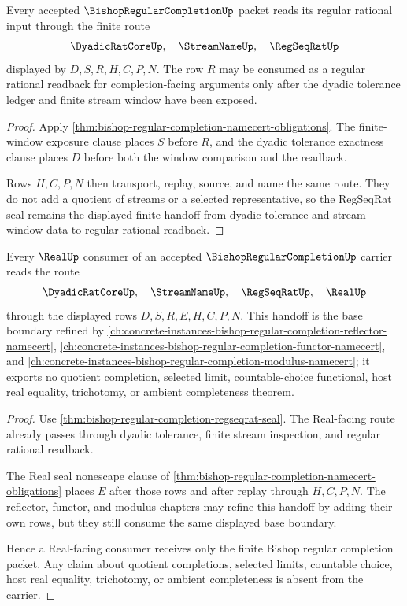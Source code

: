 \begin{theorem}
\label{thm:bishop-regular-completion-regseqrat-seal}
Every accepted $\BishopRegularCompletionUp$ packet reads its regular rational input through the finite route
$$
\DyadicRatCoreUp,\quad \StreamNameUp,\quad \RegSeqRatUp
$$
displayed by $D,S,R,H,C,P,N$. The row $R$ may be consumed as a regular rational readback for completion-facing arguments only after the dyadic tolerance ledger and finite stream window have been exposed.
\end{theorem}
\begin{proof}
Apply \autoref{thm:bishop-regular-completion-namecert-obligations}. The finite-window exposure clause places $S$ before $R$, and the dyadic tolerance exactness clause places $D$ before both the window comparison and the readback.

Rows $H,C,P,N$ then transport, replay, source, and name the same route. They do not add a quotient of streams or a selected representative, so the RegSeqRat seal remains the displayed finite handoff from dyadic tolerance and stream-window data to regular rational readback.
\end{proof}

\begin{theorem}
\label{thm:bishop-regular-completion-real-handoff}
Every $\RealUp$ consumer of an accepted $\BishopRegularCompletionUp$ carrier reads the route
$$
\DyadicRatCoreUp,\quad \StreamNameUp,\quad \RegSeqRatUp,\quad \RealUp
$$
through the displayed rows $D,S,R,E,H,C,P,N$. This handoff is the base boundary refined by \autoref{ch:concrete-instances-bishop-regular-completion-reflector-namecert}, \autoref{ch:concrete-instances-bishop-regular-completion-functor-namecert}, and \autoref{ch:concrete-instances-bishop-regular-completion-modulus-namecert}; it exports no quotient completion, selected limit, countable-choice functional, host real equality, trichotomy, or ambient completeness theorem.
\end{theorem}
\begin{proof}
Use \autoref{thm:bishop-regular-completion-regseqrat-seal}. The Real-facing route already passes through dyadic tolerance, finite stream inspection, and regular rational readback.

The Real seal nonescape clause of \autoref{thm:bishop-regular-completion-namecert-obligations} places $E$ after those rows and after replay through $H,C,P,N$. The reflector, functor, and modulus chapters may refine this handoff by adding their own rows, but they still consume the same displayed base boundary.

Hence a Real-facing consumer receives only the finite Bishop regular completion packet. Any claim about quotient completions, selected limits, countable choice, host real equality, trichotomy, or ambient completeness is absent from the carrier.
\end{proof}


